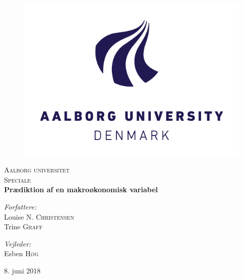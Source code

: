 \begin{titlepage}
\begin{center}


\begin{figure}[htbp]
	\centering
	\includegraphics[width=\textwidth]{./fig/aaulogo.jpg}
\end{figure}

\vspace{2cm}


\textsc{\LARGE Aalborg universitet}\\
\textsc{\Large Speciale}\\[0.5cm]

{ \huge \bfseries Prædiktion af en makroøkonomisk variabel\\[1.4cm] }



\begin{minipage}{0.4\textwidth}
\begin{flushleft} \large
\emph{Forfattere:}\\
Louise  \textsc{N. Christensen}\\
Trine \textsc{Graff}\\

\end{flushleft}
\end{minipage}
\begin{minipage}{0.4\textwidth}
\begin{flushright} \large
\emph{Vejleder:} \\
Esben \textsc{Høg}\\
\phantom{hej}

\end{flushright}
\end{minipage}

\vfill

{\large 8. juni 2018}

\end{center}
\end{titlepage}
